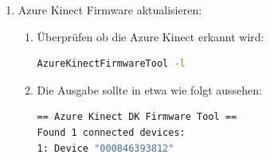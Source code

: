 \begin{enumerate}[label*=\arabic*.]
\begin{enumerate}[label*=\arabic*.]
                \begin{redbox}{Wichtig:}
                    Die jeweilige Development-Version von libk4a installieren!

                    \begin{lstlisting}[language=bash]
sudo apt install libk4a<major>.<minor>-dev
                    \end{lstlisting}

                    z.B.

                    \begin{lstlisting}[language=bash]
sudo apt install libk4a1.3-dev
                    \end{lstlisting}
                \end{redbox}

            \item Um Paketkollisionen beim Updaten zu verhindern sollten das Paket  vom Updateprozess ausgeschlossen werden:
                \begin{lstlisting}[language=bash]
sudo apt-mark hold k4a-tools
sudo apt-mark showhold
                \end{lstlisting}

            \item Nun kann das Paket  ohne Paketkollisionen installiert werden:
                \begin{lstlisting}[language=bash]
sudo apt install libk4abt1.0-dev
                \end{lstlisting}
        \end{enumerate}

    \item Azure Kinect Firmware aktualisieren:
        \begin{enumerate}[label*=\arabic*.]
            \item Überprüfen ob die Azure Kinect erkannt wird:
                \begin{lstlisting}[language=bash]
AzureKinectFirmwareTool -l
                \end{lstlisting}

            \item Die Ausgabe sollte in etwa wie folgt aussehen:
                \begin{lstlisting}[language=bash]
 == Azure Kinect DK Firmware Tool ==
Found 1 connected devices:
1: Device "000846393812"
                \end{lstlisting}


\end{enumerate}
\end{enumerate}
